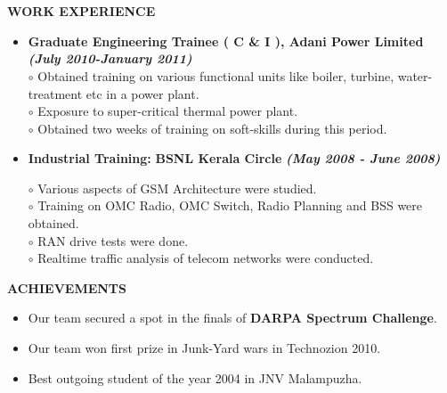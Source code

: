 \documentclass[a4paper,10pt]{article}
\begin{document}
{\qquad \\ \\ \\ \\ \\ \\ \\ \\ \\ \\ \\ \\}

 \colorbox{titleColor}{\parbox{6.5in}{\textbf{WORK EXPERIENCE}}}

 \begin{itemize}
 \setlength{\itemsep}{1pt}
 \item \textbf{Graduate Engineering Trainee ( C \& I ), Adani Power Limited}  \textbf \emph{(July 2010-January 2011)}\\ 
 $\circ$ Obtained training on various functional units like boiler, turbine, water-treatment etc in a power plant.\\
 $\circ$ Exposure to super-critical thermal power plant. \\
 $\circ$ Obtained two weeks of training on soft-skills during this period.
 
   \item \textbf{Industrial Training:} \textbf{BSNL Kerala Circle}  \textbf \emph{(May 2008 - June 2008)}        

  $\circ$ Various aspects of GSM Architecture were studied. \\
  $\circ$ Training on OMC Radio, OMC Switch, Radio Planning and BSS were obtained. \\
  $\circ$ RAN drive tests were done. \\
  $\circ$ Realtime traffic analysis of telecom networks were conducted.

\end{itemize}

 \colorbox{titleColor}{\parbox{6.5in}{\textbf{ACHIEVEMENTS}}}

 \begin{itemize}
  \item Our team secured a spot in the finals of \textbf{DARPA Spectrum Challenge}.
  \item Our team won first prize in Junk-Yard wars in Technozion 2010.
  \item Best outgoing student of the year 2004 in JNV Malampuzha.
  \end{itemize}
  
\end{document}
